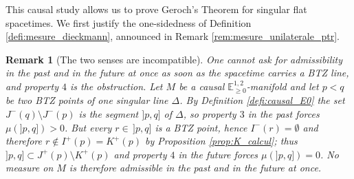 \documentclass[a4paper,twoside]{article}
\newcommand{\mass}[1]{\mathbb{E}^{1,2}_{#1}}
\newtheorem{rem}[lem]{Remark}
\begin{document}
This causal study allows us to prove Geroch's Theorem for singular flat spacetimes. We first
justify the one-sidedness of Definition \ref{defi:mesure_dieckmann}, announced in Remark
\ref{rem:mesure_unilaterale_ptr}.

\begin{rem}[The two senses are incompatible]\label{rem:mesure_unilaterale}
One cannot ask for admissibility in the past and in the future at once as soon as the spacetime
carries a BTZ line, and property $4$ is the obstruction. Let $M$ be a causal
$\mass{\geq0}$-manifold and let $p<q$ be two BTZ points of one singular line $\Delta$. By
Definition \ref{defi:causal_E0} the set $J^-(q)\setminus J^-(p)$ is the segment $]p,q]$ of
$\Delta$, so property $3$ in the past forces $\mu(]p,q])>0$. But every $r\in\,]p,q]$ is a BTZ
point, hence $I^-(r)=\emptyset$ and therefore $r\notin I^+(p)=K^+(p)$ by Proposition
\ref{prop:K_calcul}; thus $]p,q]\subset J^+(p)\setminus K^+(p)$ and property $4$ in the future
forces $\mu(]p,q])=0$. No measure on $M$ is therefore admissible in the past and in the future at
once.
\end{rem}
\end{document}
